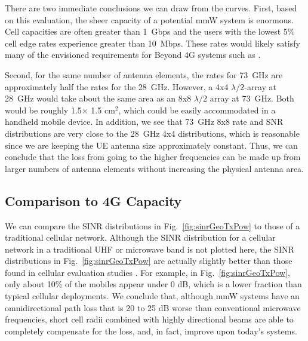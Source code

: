 \documentclass[journal]{IEEEtran}
\begin{document}
There are two immediate conclusions we can draw from the curves.
First, based on this evaluation, the sheer capacity of a potential
mmW system is enormous.  Cell capacities are often greater than 1~Gbps and
the users with the lowest 5\% cell edge rates experience greater than 10~Mbps.
These rates would likely satisfy
many of the envisioned requirements for Beyond 4G systems such as
\cite{NSN-B4G:12,Ghosh-mmw:2013}.

Second, for the same number of antenna elements, the rates for 73~GHz
are approximately half the rates for the 28~GHz.  However, a 4x4 $\lambda/2$-array
at 28~GHz would take about the same area as an 8x8 $\lambda/2$ array at 73~GHz.
Both would be roughly 1.5$\times$ 1.5 cm$^2$,
which could be easily accommodated in a handheld
mobile device.  In addition, we see that 73~GHz 8x8 rate and SNR distributions
are very close to the 28~GHz 4x4 distributions, which is reasonable since we are
keeping the UE antenna size approximately
constant.  Thus, we can conclude that the
loss from going to the higher frequencies can be made up from larger numbers of antenna
elements without increasing the physical antenna area.

\subsection{Comparison to 4G Capacity}

We can compare the SINR distributions in Fig.~\ref{fig:sinrGeoTxPow}
to those of a traditional cellular network.
Although the SINR distribution for a cellular network in a traditional
UHF or microwave band
is not plotted here, the SINR distributions in Fig.~\ref{fig:sinrGeoTxPow}
are actually slightly better than those found in cellular
evaluation studies \cite{3GPP36.814}.
For example,  in Fig.~\ref{fig:sinrGeoTxPow}, only about 10\% of the mobiles
appear under 0 dB, which is a lower fraction than typical cellular deployments.
We conclude that, although mmW systems have an omnidirectional path loss that
is 20 to 25 dB worse than conventional microwave frequencies, short cell radii combined
with highly directional beams are able to completely compensate for the loss,
and, in fact, improve upon today's systems.
\end{document}

